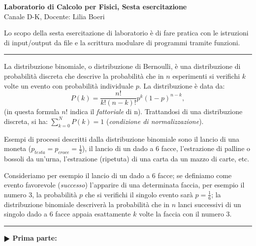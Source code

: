 \documentclass[11pt]{article}
\begin{document}
\pagestyle{empty}

\begin{center}
{\Large \bf  Laboratorio di Calcolo per Fisici, Sesta esercitazione\\[2mm]}
{\large Canale D-K, Docente: Lilia Boeri}
\end{center}
\vspace{4mm}

\begin{mdframed}[backgroundcolor=panna]
  Lo scopo della sesta esercitazione di laboratorio \`e di fare pratica con
le istruzioni di input/output da file e la scrittura modulare di programmi tramite funzioni.
  \end{mdframed}
%
%
\hrule
\vspace{2mm}
La distribuzione binomiale, o distribuzione di Bernoulli, \`e una distribuzione di probabilit\`a
discreta che descrive la probabilit\`a che in $n$ esperimenti si verifichi $k$ volte un evento
con probabilit\`a individuale $p$.
La distribuzione \`e data da:
\[
P(k)=\frac{n!}{k! (n-k)!}p^{k}(1-p)^{n-k},
\]
(in questa formula $n!$ indica il {\em fattoriale\/} di n).
Trattandosi di una distribuzione discreta, si ha: $\sum_{k=0}^{N} P(k)=1$ ({\em condizione di normalizzazione\/}).

Esempi di processi descritti dalla distribuzione binomiale sono il lancio di una moneta ($p_{testa}=p_{croce}=\frac{1}{2}$), il lancio di un dado a 6 facce, l'estrazione di palline o bossoli da un'urna, l'estrazione (ripetuta) di una carta da un mazzo di carte, etc.

Consideriamo per esempio il lancio di un dado a 6 facce;
se definiamo come evento favorevole ({\em successo\/}) l'apparire di una determinata faccia, per esempio il numero 3,
la probabilit\`a $p$ che si verifichi il singolo evento sar\`a $p=\frac{1}{6}$; la distribuzione binomiale descriver\`a la probabilit\`a che in $n$ lanci successivi di un singolo dado a 6 facce appaia esattamente $k$ volte la faccia con il numero 3.

\vspace{2mm}
\hrule
\vspace{2mm}
\textbf{$\RHD$ Prima parte:}
\end{document}
